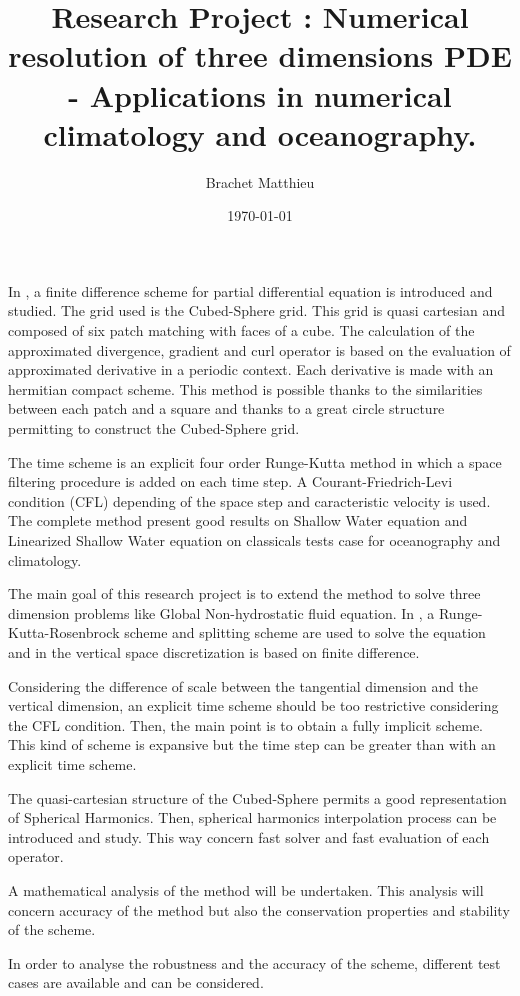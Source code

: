 \documentclass[10pt,a4paper]{amsart}
\author{Brachet Matthieu}
\title{Research Project : Numerical resolution of three dimensions PDE - Applications in numerical climatology and oceanography.}
\date\today
\begin{document}
\maketitle

In \cite{Croisille-10, Croisille-12, Brachet-Croisille}, a finite difference scheme for partial differential equation is introduced and studied. The grid used is the Cubed-Sphere grid. This grid is quasi cartesian and composed of six patch matching with faces of a cube.
The calculation of the approximated divergence, gradient and curl operator is based on the evaluation of approximated derivative in a periodic context. Each derivative is made with an hermitian compact scheme. This method is possible thanks to the similarities between each patch and a square and thanks to a great circle structure permitting to construct the Cubed-Sphere grid.

The time scheme is an explicit four order Runge-Kutta method in which a space filtering procedure is added on each time step. A Courant-Friedrich-Levi condition (CFL) depending of the space step and caracteristic velocity is used.
The complete method present good results on Shallow Water equation and Linearized Shallow Water equation on classicals tests case for oceanography and climatology.

The main goal of this research project is to extend the method to solve three dimension problems like Global Non-hydrostatic fluid equation. In \cite{Ullrich}, a Runge-Kutta-Rosenbrock scheme and splitting scheme are used to solve the equation and in \cite{Choi-Hong} the vertical space discretization is based on finite difference.

Considering the difference of scale between the tangential dimension and the vertical dimension, an explicit time scheme should be too restrictive considering the CFL condition. Then, the main point is to obtain a fully implicit scheme. This kind of scheme is expansive but the time step can be greater than with an explicit time scheme. 

The quasi-cartesian structure of the Cubed-Sphere permits a good representation of Spherical Harmonics. Then, spherical harmonics interpolation process can be introduced and study. This way concern fast solver and fast evaluation of each operator.

A mathematical analysis of the method will be undertaken. This analysis will concern accuracy of the method but also the conservation properties and stability of the scheme. 

In order to analyse the robustness and the accuracy of the scheme, different test cases are available and can be considered. 





\end{document}
